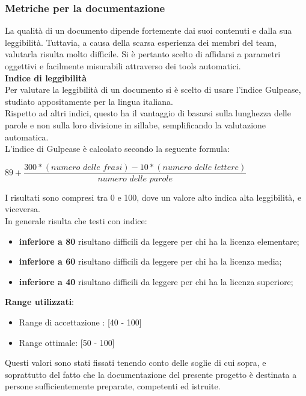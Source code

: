 \subsubsection{Metriche per la documentazione}\label{MetricheDoc}
\hypertarget{metriche_documenti}{}
La qualità di un documento dipende fortemente dai suoi contenuti e dalla sua leggibilità. Tuttavia, a causa della scarsa esperienza dei membri del team, valutarla risulta molto difficile. Si è pertanto scelto di affidarsi a parametri oggettivi e facilmente misurabili attraverso dei tools automatici.\\

\textbf{Indice di leggibilità}\\

Per valutare la leggibilità di un documento si è scelto di usare l'indice Gulpease, studiato appositamente per la lingua italiana.\\
Rispetto ad altri indici, questo ha il vantaggio di basarsi sulla lunghezza delle parole e non sulla loro divisione in sillabe, semplificando la valutazione automatica.\\
L'indice di Gulpease è calcolato secondo la seguente formula:
\begin{center}
\begin{math}
	89 + 
		\dfrac	{300 * (\textit{numero delle frasi}) - 10 * (\textit{numero delle lettere})}
				{\textit{numero delle parole}}
\end{math}
\end{center}
I risultati sono compresi tra 0 e 100, dove un valore alto indica alta leggibilità, e viceversa. \\
In generale risulta che testi con indice:
\begin{itemize}
	\item \textbf{inferiore a 80} risultano difficili da leggere per chi ha la licenza elementare;
	\item \textbf{inferiore a 60} risultano difficili da leggere per chi ha la licenza media;
	\item \textbf{inferiore a 40} risultano difficili da leggere per chi ha la licenza superiore;
\end{itemize}
\textbf{Range utilizzati}:
\begin{itemize}
	\item Range di accettazione : [40 - 100]
	\item Range ottimale: [50 - 100]
\end{itemize}
Questi valori sono stati fissati tenendo conto delle soglie di cui sopra, e soprattutto del fatto che la documentazione del presente progetto è destinata a persone sufficientemente preparate, competenti ed istruite.

